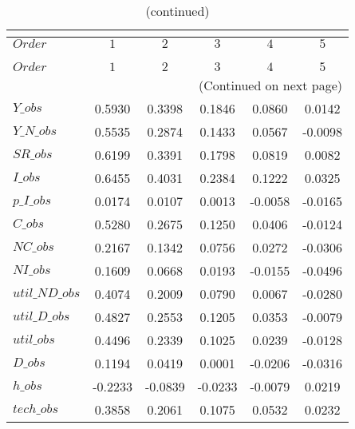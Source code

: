  
\begin{center}
\begin{longtable}{lccccc} 
\caption{COEFFICIENTS OF AUTOCORRELATION}\\
 \label{Table:th_autocorr_matrix}\\
\toprule 
$Order          $	 & 	 $          1$	 & 	 $          2$	 & 	 $          3$	 & 	 $          4$	 & 	 $          5$\\
\midrule \endfirsthead 
\caption{(continued)}\\
 \toprule \\ 
$Order          $	 & 	 $          1$	 & 	 $          2$	 & 	 $          3$	 & 	 $          4$	 & 	 $          5$\\
\midrule \endhead 
\midrule \multicolumn{6}{r}{(Continued on next page)} \\ \bottomrule \endfoot 
\bottomrule \endlastfoot 
$Y\_obs         $	 & 	     0.5930	 & 	     0.3398	 & 	     0.1846	 & 	     0.0860	 & 	     0.0142 \\ 
$Y\_N\_obs      $	 & 	     0.5535	 & 	     0.2874	 & 	     0.1433	 & 	     0.0567	 & 	    -0.0098 \\ 
$SR\_obs        $	 & 	     0.6199	 & 	     0.3391	 & 	     0.1798	 & 	     0.0819	 & 	     0.0082 \\ 
$I\_obs         $	 & 	     0.6455	 & 	     0.4031	 & 	     0.2384	 & 	     0.1222	 & 	     0.0325 \\ 
$p\_I\_obs      $	 & 	     0.0174	 & 	     0.0107	 & 	     0.0013	 & 	    -0.0058	 & 	    -0.0165 \\ 
$C\_obs         $	 & 	     0.5280	 & 	     0.2675	 & 	     0.1250	 & 	     0.0406	 & 	    -0.0124 \\ 
$NC\_obs        $	 & 	     0.2167	 & 	     0.1342	 & 	     0.0756	 & 	     0.0272	 & 	    -0.0306 \\ 
$NI\_obs        $	 & 	     0.1609	 & 	     0.0668	 & 	     0.0193	 & 	    -0.0155	 & 	    -0.0496 \\ 
$util\_ND\_obs  $	 & 	     0.4074	 & 	     0.2009	 & 	     0.0790	 & 	     0.0067	 & 	    -0.0280 \\ 
$util\_D\_obs   $	 & 	     0.4827	 & 	     0.2553	 & 	     0.1205	 & 	     0.0353	 & 	    -0.0079 \\ 
$util\_obs      $	 & 	     0.4496	 & 	     0.2339	 & 	     0.1025	 & 	     0.0239	 & 	    -0.0128 \\ 
$D\_obs         $	 & 	     0.1194	 & 	     0.0419	 & 	     0.0001	 & 	    -0.0206	 & 	    -0.0316 \\ 
$h\_obs         $	 & 	    -0.2233	 & 	    -0.0839	 & 	    -0.0233	 & 	    -0.0079	 & 	     0.0219 \\ 
$tech\_obs      $	 & 	     0.3858	 & 	     0.2061	 & 	     0.1075	 & 	     0.0532	 & 	     0.0232 \\ 
\end{longtable}
 \end{center}
